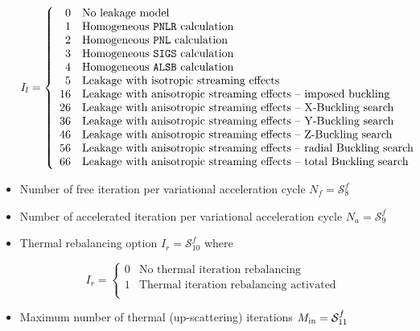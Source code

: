 \begin{itemize}
\begin{displaymath}
I_{l} = \left\{
\begin{array}{rl}
 0 & \textrm{No leakage model} \\
 1 & \textrm{Homogeneous \moc{PNLR} calculation} \\
 2 & \textrm{Homogeneous \moc{PNL} calculation} \\
 3 & \textrm{Homogeneous \moc{SIGS} calculation} \\
 4 & \textrm{Homogeneous \moc{ALSB} calculation} \\
 5 & \textrm{Leakage with isotropic streaming effects} \\
16 & \textrm{Leakage with anisotropic streaming effects -- imposed buckling} \\
26 & \textrm{Leakage with anisotropic streaming effects -- X-Buckling search} \\
36 & \textrm{Leakage with anisotropic streaming effects -- Y-Buckling search} \\
46 & \textrm{Leakage with anisotropic streaming effects -- Z-Buckling search} \\
56 & \textrm{Leakage with anisotropic streaming effects -- radial Buckling search} \\
66 & \textrm{Leakage with anisotropic streaming effects -- total Buckling search} \\
\end{array} \right.
\end{displaymath}

\item Number of free iteration per variational acceleration cycle $N_{f}=\mathcal{S}^{f}_{8}$
 
\item Number of accelerated iteration per variational acceleration cycle $N_{a}=\mathcal{S}^{f}_{9}$ 

\item Thermal rebalancing option $I_{r}=\mathcal{S}^{f}_{10}$ where

\begin{displaymath}
I_{r} = \left\{
\begin{array}{rl}
 0 & \textrm{No thermal iteration rebalancing} \\
 1 & \textrm{Thermal iteration rebalancing activated} \\
\end{array} \right.
\end{displaymath}

\item Maximum number of thermal (up-scattering) iterations $M_{\rm in}=\mathcal{S}^{f}_{11}$


\end{itemize}
